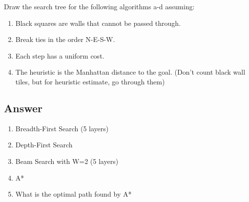 \documentclass[11pt]{article}
\begin{document}
\begin{flushleft}
Draw the search tree for the following algorithms a-d assuming: 
\begin{enumerate}
    \item Black squares are walls that cannot be passed through. 
    \item Break ties in the order N-E-S-W.
    \item Each step has a uniform cost.
    \item The heuristic is the Manhattan distance to the goal. (Don’t count
        black wall tiles, but for heuristic estimate, go through them)
\end{enumerate}

\subsection*{Answer}
\begin{enumerate}
    \item Breadth-First Search (5 layers)
    \item Depth-First Search
    \item Beam Search with W=2 (5 layers)
    \item A*
    \item What is the optimal path found by A*
\end{enumerate}

\end{flushleft}
\end{document}
